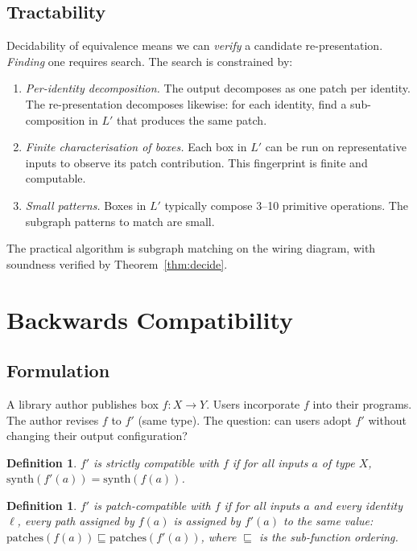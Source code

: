 \documentclass[11pt]{article}
\newtheorem{definition}[theorem]{Definition}
\begin{document}
    \subsection{Tractability}

    Decidability of equivalence means we can \emph{verify} a candidate re-presentation.
    \emph{Finding} one requires search. The search is constrained by:

    \begin{enumerate}
        \item \emph{Per-identity decomposition.} The output decomposes as one patch per
        identity. The re-presentation decomposes likewise: for each identity, find a
        sub-composition in $L'$ that produces the same patch.
        \item \emph{Finite characterisation of boxes.} Each box in $L'$ can be run on
        representative inputs to observe its patch contribution. This fingerprint is
        finite and computable.
        \item \emph{Small patterns.} Boxes in $L'$ typically compose 3--10 primitive
        operations. The subgraph patterns to match are small.
    \end{enumerate}

    The practical algorithm is subgraph matching on the wiring diagram, with soundness
    verified by Theorem~\ref{thm:decide}.

    \section{Backwards Compatibility}
    \label{sec:compat}

    \subsection{Formulation}

    A library author publishes box $f \colon X \to Y$. Users incorporate $f$ into their
    programs. The author revises $f$ to $f'$ (same type). The question: can users adopt
    $f'$ without changing their output configuration?

    \begin{definition}
        $f'$ is \emph{strictly compatible} with $f$ if for all inputs $a$ of type $X$,
        $\mathrm{synth}(f'(a)) = \mathrm{synth}(f(a))$.
    \end{definition}

    \begin{definition}
        $f'$ is \emph{patch-compatible} with $f$ if for all inputs $a$ and every identity
        $\ell$, every path assigned by $f(a)$ is assigned by $f'(a)$ to the same value:
        $\mathrm{patches}(f(a)) \sqsubseteq \mathrm{patches}(f'(a))$, where $\sqsubseteq$
        is the sub-function ordering.
    \end{definition}
\end{document}
